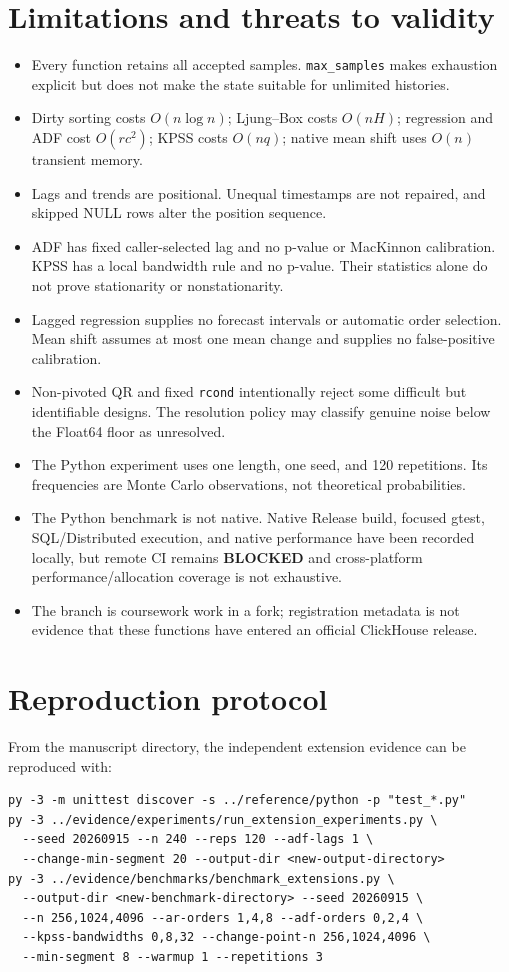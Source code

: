 \documentclass[11pt]{article}
\begin{document}
\section{Limitations and threats to validity}

\begin{itemize}
\item Every function retains all accepted samples. \texttt{max\_samples} makes exhaustion explicit but does not make the state suitable for unlimited histories.
\item Dirty sorting costs $O(n\log n)$; Ljung--Box costs $O(nH)$; regression and ADF cost $O(rc^2)$; KPSS costs $O(nq)$; native mean shift uses $O(n)$ transient memory.
\item Lags and trends are positional. Unequal timestamps are not repaired, and skipped NULL rows alter the position sequence.
\item ADF has fixed caller-selected lag and no p-value or MacKinnon calibration. KPSS has a local bandwidth rule and no p-value. Their statistics alone do not prove stationarity or nonstationarity.
\item Lagged regression supplies no forecast intervals or automatic order selection. Mean shift assumes at most one mean change and supplies no false-positive calibration.
\item Non-pivoted QR and fixed \texttt{rcond} intentionally reject some difficult but identifiable designs. The resolution policy may classify genuine noise below the Float64 floor as unresolved.
\item The Python experiment uses one length, one seed, and 120 repetitions. Its frequencies are Monte Carlo observations, not theoretical probabilities.
\item The Python benchmark is not native. Native Release build, focused gtest, SQL/Distributed execution, and native performance have been recorded locally, but remote CI remains \textbf{BLOCKED} and cross-platform performance/allocation coverage is not exhaustive.
\item The branch is coursework work in a fork; registration metadata is not evidence that these functions have entered an official ClickHouse release.
\end{itemize}

\section{Reproduction protocol}

From the manuscript directory, the independent extension evidence can be reproduced with:
\begin{lstlisting}[language={}]
py -3 -m unittest discover -s ../reference/python -p "test_*.py"
py -3 ../evidence/experiments/run_extension_experiments.py \
  --seed 20260915 --n 240 --reps 120 --adf-lags 1 \
  --change-min-segment 20 --output-dir <new-output-directory>
py -3 ../evidence/benchmarks/benchmark_extensions.py \
  --output-dir <new-benchmark-directory> --seed 20260915 \
  --n 256,1024,4096 --ar-orders 1,4,8 --adf-orders 0,2,4 \
  --kpss-bandwidths 0,8,32 --change-point-n 256,1024,4096 \
  --min-segment 8 --warmup 1 --repetitions 3
\end{lstlisting}
\end{document}
